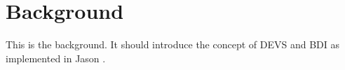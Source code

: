 \FloatBarrier
\section{Background} \label{sec:Background}
\FloatBarrier

This is the background. It should introduce the concept of \gls{DEVS} and \gls{BDI} as implemented in Jason \cite{JasonBook}.
